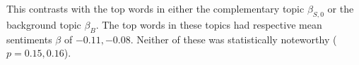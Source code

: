 This contrasts with the top words in either the complementary topic
$\beta_{S,0}$ or the background topic $\beta_{B}$.  The top words in
these topics had respective mean sentiments $\beta$ of $-0.11, -0.08$.
Neither of these was statistically noteworthy ($p=0.15,0.16$).



